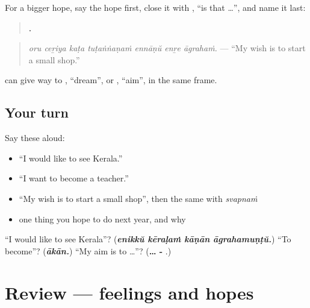 \begin{grammarlens}[title={Grammar Lens: … \ml{എന്നാണ്} \ml{എന്റെ} \ml{ആഗ്രഹം}}]
For a bigger hope, say the hope first, close it with \textbf{}, \textquotedblleft{}is that …\textquotedblright{}, and name it last:

\begin{quote}
\textbf{      .}
\end{quote}

\begin{quote}
\emph{oru ceṟiya kaṭa tuṭaṅṅaṇaṁ ennāṇŭ enṟe āgrahaṁ.} — \textquotedblleft{}My wish is to start a small shop.\textquotedblright{}
\end{quote}

\textbf{} can give way to \textbf{}, \textquotedblleft{}dream\textquotedblright{}, or \textbf{}, \textquotedblleft{}aim\textquotedblright{}, in the same frame.
\end{grammarlens}

\subsection*{Your turn}
Say these aloud:

\begin{itemize}
\raggedright
  \item \textquotedblleft{}I would like to see Kerala.\textquotedblright{}
  \item \textquotedblleft{}I want to become a teacher.\textquotedblright{}
  \item \textquotedblleft{}My wish is to start a small shop\textquotedblright{}, then the same with \emph{svapnaṁ}
  \item one thing you hope to do next year, and why
\end{itemize}

\begin{tcolorbox}[breakable,colback=teal!4,colframe=teal!35!black,title={Before you move on}]
\textquotedblleft{}I would like to see Kerala\textquotedblright{}? (\emph{\textbf{enikkŭ kēraḷaṁ kāṇān āgrahamuṇṭŭ.}}) \textquotedblleft{}To become\textquotedblright{}? (\emph{\textbf{ākān.}}) \textquotedblleft{}My aim is to …\textquotedblright{}? (\textbf{… -   }.)
\end{tcolorbox}
\section[(review)]{Review — feelings and hopes}

